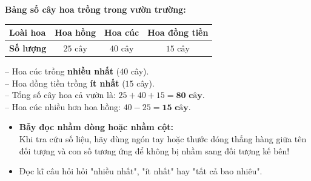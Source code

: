 \documentclass[11pt,a4paper]{article}
\begin{document}
\vspace{-2.5mm}
\noindent
\begin{minipage}[t]{0.49\textwidth}\vspace{0pt}
\begin{tcolorbox}[
  enhanced,
  colback=green!4!white,
  colframe=green!60!black,
  arc=2mm, boxrule=0.8pt,
  left=2mm, right=2mm, top=1.8mm, bottom=1.8mm,
  title={\footnotesize\bfseries\color{white}\faCheckCircle\ Ví dụ thực hành chuẩn mực}
]
{\footnotesize
\textbf{Bảng số cây hoa trồng trong vườn trường:}\\
\begin{center}
\renewcommand{\arraystretch}{1.1}
\begin{tabular}{|l|c|c|c|}
  \hline
  \textbf{Loài hoa} & Hoa hồng & Hoa cúc & Hoa đồng tiền \\
  \hline
  \textbf{Số lượng} & $25\text{ cây}$ & $40\text{ cây}$ & $15\text{ cây}$ \\
  \hline
\end{tabular}
\end{center}
-- Hoa cúc trồng \textbf{nhiều nhất} ($40$ cây).\\
-- Hoa đồng tiền trồng \textbf{ít nhất} ($15$ cây).\\
-- Tổng số cây hoa cả vườn là: $25 + 40 + 15 = \mathbf{80\text{ cây}}$.\\
-- Hoa cúc nhiều hơn hoa hồng: $40 - 25 = \mathbf{15\text{ cây}}$.
}
\end{tcolorbox}
\end{minipage}
\hfill
\begin{minipage}[t]{0.49\textwidth}\vspace{0pt}
\begin{tcolorbox}[
  enhanced,
  colback=red!4!white,
  colframe=red!70!black,
  arc=2mm, boxrule=0.8pt,
  left=2mm, right=2mm, top=1.8mm, bottom=1.8mm,
  title={\footnotesize\bfseries\color{white}\faExclamationTriangle\ Mẹo tránh bẫy trắc nghiệm}
]
{\footnotesize
\begin{itemize}\setlength{\itemsep}{1.5pt}\setlength{\leftskip}{-2.5mm}
  \item \textbf{Bẫy đọc nhầm dòng hoặc nhầm cột:}\\
  Khi tra cứu số liệu, hãy dùng ngón tay hoặc thước dóng thẳng hàng giữa tên đối tượng và con số tương ứng để không bị nhầm sang đối tượng kế bên!
  \item Đọc kĩ câu hỏi hỏi "nhiều nhất", "ít nhất" hay "tất cả bao nhiêu".
\end{itemize}
}
\end{tcolorbox}
\end{minipage}
\end{document}
